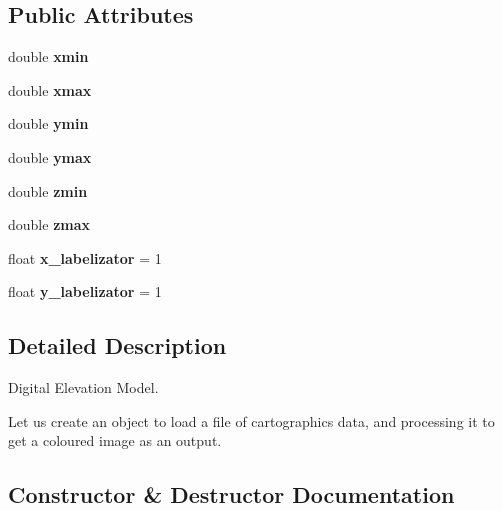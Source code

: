 \subsection*{Public Attributes}
\begin{DoxyCompactItemize}
\item 
\mbox{\label{classDEM_a22732c433a3cc1d4d8f9cb35e24395bc}} 
double {\bfseries xmin}
\item 
\mbox{\label{classDEM_a16f764fb785c33b98a8f011ed2bd8a43}} 
double {\bfseries xmax}
\item 
\mbox{\label{classDEM_ad5dc7476428ed3f19d5007f7a7a1efd4}} 
double {\bfseries ymin}
\item 
\mbox{\label{classDEM_a8e805974b711783d8e40fb9d1eda48a3}} 
double {\bfseries ymax}
\item 
\mbox{\label{classDEM_a9aaf109ccf41fedb0461de327e7d2945}} 
double {\bfseries zmin}
\item 
\mbox{\label{classDEM_a114f2350fe4801770ab19a213cb5674c}} 
double {\bfseries zmax}
\item 
\mbox{\label{classDEM_a666d01098888bbc8ad8fd8ef984c1f8b}} 
float {\bfseries x\+\_\+labelizator} = 1
\item 
\mbox{\label{classDEM_aec340951d2e311485b4e0e76a6c5161a}} 
float {\bfseries y\+\_\+labelizator} = 1
\end{DoxyCompactItemize}


\subsection{Detailed Description}
Digital Elevation Model. 

Let us create an object to load a file of cartographics data, and processing it to get a coloured image as an output. 

\subsection{Constructor \& Destructor Documentation}
\mbox{\label{classDEM_a64156558bc796710150012bf7873a2ad}} 
